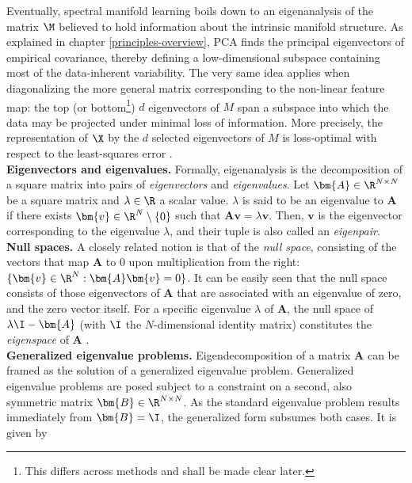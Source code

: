 Eventually, spectral manifold learning boils down to an eigenanalysis 
of the matrix $\M$ believed to hold information about the intrinsic 
manifold structure.
As explained in chapter \ref{principles-overview}, PCA finds the principal 
eigenvectors of empirical covariance, thereby defining a low-dimensional 
subspace containing most of the data-inherent variability.
The very same idea applies when diagonalizing the more general matrix 
corresponding to the non-linear feature map: the top (or bottom\footnote{
This differs across methods and shall be made clear later.
}) $d$ eigenvectors of $M$ span a subspace into which the data may be projected 
under minimal loss of information.
More precisely, the representation of $\X$ by the $d$ selected eigenvectors of 
$M$ is loss-optimal with respect to the least-squares error
\citep{schoelkopfetal1998}.
\\

\textbf{Eigenvectors and eigenvalues.} Formally, eigenanalysis is the 
decomposition of a square matrix into pairs of \textit{eigenvectors} and 
\textit{eigenvalues}.
Let $\bm{A} \in \R^{N \times N}$ be a square matrix and $\lambda \in \R$ a 
scalar value. 
$\lambda$ is said to be an eigenvalue to $\bm{A}$ if there exists 
$\bm{v} \in \R^N \setminus \{0\}$ such that $\bm{A} \bm{v} = \lambda \bm{v}$.
Then, $\bm{v}$ is the eigenvector corresponding to the eigenvalue $\lambda$, and 
their tuple is also called an \textit{eigenpair}.
\\

\textbf{Null spaces.} A closely related notion is that of the 
\textit{null space}, consisting of the vectors that map $\bm{A}$ to 0 upon 
multiplication from the right: $\{\bm{v} \in \R^N: \bm{A} \bm{v} = 0\}$.
It can be easily seen that the null space consists of those eigenvectors of 
$\bm{A}$ that are associated with an eigenvalue of zero, and the zero vector 
itself. 
For a specific eigenvalue $\lambda$ of $\bm{A}$, the null space of 
$\lambda \I - \bm{A}$ 
(with $\I$ the $N$-dimensional identity matrix) constitutes the 
\textit{eigenspace} of $\bm{A}$ \citep{boermmehl2012}.
\\

\textbf{Generalized eigenvalue problems.} Eigendecomposition of a matrix 
$\bm{A}$ can be framed as the solution of a generalized eigenvalue problem.
Generalized eigenvalue problems are posed subject to a constraint on a second, 
also symmetric matrix $\bm{B} \in \R^{N \times N}$.
As the standard eigenvalue problem results immediately from 
$\bm{B} = \I$, the generalized form subsumes both cases.
It is given by 

